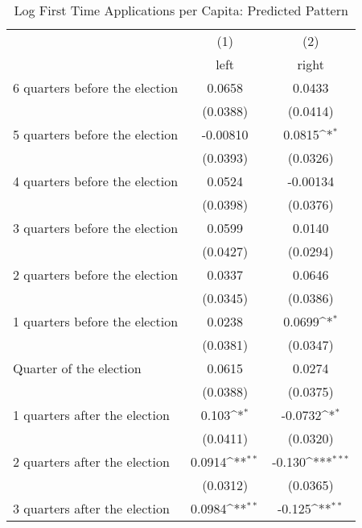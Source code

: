 \begin{table}[htbp]\centering
\def\sym#1{\ifmmode^{#1}\else\(^{#1}\)\fi}
\caption{Log First Time Applications per Capita: Predicted Pattern}
\begin{tabular}{l*{2}{c}}
\hline\hline
                    &\multicolumn{1}{c}{(1)}&\multicolumn{1}{c}{(2)}\\
                    &\multicolumn{1}{c}{left}&\multicolumn{1}{c}{right}\\
\hline
 6 quarters before the election&      0.0658         &      0.0433         \\
                    &    (0.0388)         &    (0.0414)         \\
[1em]
 5 quarters before the election&    -0.00810         &      0.0815\sym{*}  \\
                    &    (0.0393)         &    (0.0326)         \\
[1em]
 4 quarters before the election&      0.0524         &    -0.00134         \\
                    &    (0.0398)         &    (0.0376)         \\
[1em]
 3 quarters before the election&      0.0599         &      0.0140         \\
                    &    (0.0427)         &    (0.0294)         \\
[1em]
 2 quarters before the election&      0.0337         &      0.0646         \\
                    &    (0.0345)         &    (0.0386)         \\
[1em]
 1 quarters before the election&      0.0238         &      0.0699\sym{*}  \\
                    &    (0.0381)         &    (0.0347)         \\
[1em]
Quarter of the election&      0.0615         &      0.0274         \\
                    &    (0.0388)         &    (0.0375)         \\
[1em]
 1 quarters after the election&       0.103\sym{*}  &     -0.0732\sym{*}  \\
                    &    (0.0411)         &    (0.0320)         \\
[1em]
 2 quarters after the election&      0.0914\sym{**} &      -0.130\sym{***}\\
                    &    (0.0312)         &    (0.0365)         \\
[1em]
 3 quarters after the election&      0.0984\sym{**} &      -0.125\sym{**} \\

\end{tabular}
\end{table}
